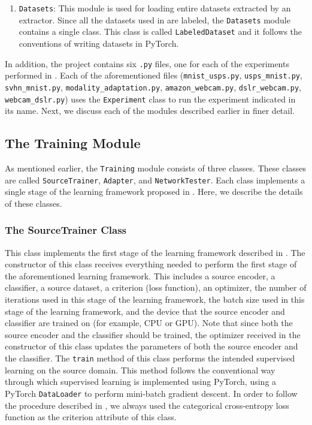 \documentclass[14pt]{extarticle}
\begin{document}
\begin{enumerate}
			\item \texttt{Datasets}: This module is used for loading entire datasets extracted by an extractor. Since all the datasets used in \cite{adda} are labeled, the \texttt{Datasets} module contains a single class. This class is called \texttt{LabeledDataset} and it follows the conventions of writing datasets in PyTorch.
		\end{enumerate}
		In addition, the project contains six \texttt{.py} files, one for each of the experiments performed in \cite{adda}. Each of the aforementioned files (\texttt{mnist\_usps.py}, \texttt{usps\_mnist.py}, \texttt{svhn\_mnist.py}, \texttt{modality\_adaptation.py}, \texttt{amazon\_webcam.py}, \texttt{dslr\_webcam.py}, \texttt{webcam\_dslr.py}) uses the \texttt{Experiment} class to run the experiment indicated in its name. Next, we discuss each of the modules described earlier in finer detail.
		\subsection{The Training Module}
		As mentioned earlier, the \texttt{Training} module consists of three classes. These classes are called \texttt{SourceTrainer}, \texttt{Adapter}, and \texttt{NetworkTester}. Each class implements a single stage of the learning framework proposed in \cite{adda}. Here, we describe the details of these classes.
		\subsubsection{The SourceTrainer Class}
		This class implements the first stage of the learning framework described in \cite{adda}. The constructor of this class receives everything needed to perform the first stage of the aforementioned learning framework. This includes a source encoder, a classifier, a source dataset, a criterion (loss function), an optimizer, the number of iterations used in this stage of the learning framework, the batch size used in this stage of the learning framework, and the device that the source encoder and classifier are trained on (for example, CPU or GPU). Note that since both the source encoder and the classifier should be trained, the optimizer received in the constructor of this class updates the parameters of both the source encoder and the classifier. The \texttt{train} method of this class performs the intended supervised learning on the source domain. This method follows the conventional way through which supervised learning is implemented using PyTorch, using a PyTorch \texttt{DataLoader} to perform mini-batch gradient descent. In order to follow the procedure described in \cite{adda}, we always used the categorical cross-entropy loss function as the criterion attribute of this class.
\end{document}
